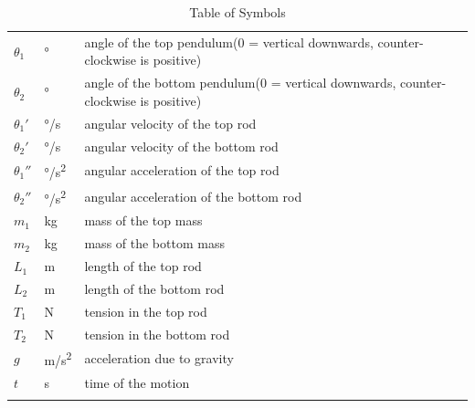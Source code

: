 \documentclass[12pt]{article}
\begin{document}
\begin{table}[H]
\begin{longtable*}{l l p{12cm}}
  \\
  $\theta_1$ & \si[per-mode=symbol] {\degree} & angle of the top pendulum(0 = vertical downwards, counter-clockwise is positive)
  \\
  $\theta_2$ & \si[per-mode=symbol] {\degree} & angle of the bottom pendulum(0 = vertical downwards, counter-clockwise is positive)
  \\ 
  ${\theta_1}'$ & \si[per-mode=symbol] {\degree\per\second} & angular velocity of the top rod
  \\
  ${\theta_2}'$ & \si[per-mode=symbol] {\degree\per\second} & angular velocity of the bottom rod
  \\
  ${\theta_1}''$ & \si[per-mode=symbol] {\degree\per\square\second} & angular acceleration of the top rod
  \\
  ${\theta_2}''$ & \si[per-mode=symbol] {\degree\per\square\second} & angular acceleration of the bottom rod
  \\
  $m_1$ & \si[per-mode=symbol] {\kilogram} & mass of the top mass
  \\
  $m_2$ & \si[per-mode=symbol] {\kilogram} & mass of the bottom mass
  \\
  $L_1$ & \si[per-mode=symbol] {\metre} & length of the top rod
  \\
  $L_2$ & \si[per-mode=symbol] {\metre} & length of the bottom rod
  \\
  $T_1$ & \si[per-mode=symbol] {\newton} & tension in the top rod
  \\
  $T_2$ & \si[per-mode=symbol] {\newton} & tension in the bottom rod
  \\
  $g$ & \si[per-mode=symbol] {\metre\per\square\second} & acceleration due to gravity
  \\
  $t$ &  \si[per-mode=symbol] {\second}  & time of the motion
  \\
  \bottomrule\\
  \end{longtable*}
  \caption{Table of Symbols} 
\end{table}
~\newline
\end{document}
